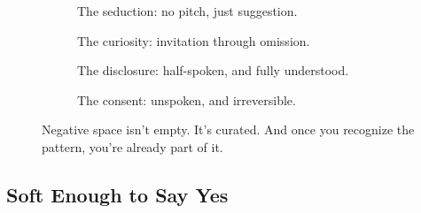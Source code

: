 \medskip

\begin{figure}[H]
  \centering
  
  \begin{subfigure}[t]{0.45\textwidth}
  \centering
  \caption*{The seduction: no pitch, just suggestion.}
  \end{subfigure}
  \hfill
  \begin{subfigure}[t]{0.45\textwidth}
  \centering
  \caption*{The curiosity: invitation through omission.}
  \end{subfigure}
  
  \vspace{1em}
  
  \begin{subfigure}[t]{0.45\textwidth}
  \centering
  \caption*{The disclosure: half-spoken, and fully understood.}
  \end{subfigure}
  \hfill
  \begin{subfigure}[t]{0.45\textwidth}
  \centering
  \caption*{The consent: unspoken, and irreversible.}
  \end{subfigure}
  
  \caption*{Negative space isn’t empty. It’s curated. And once you recognize the pattern, you’re already part of it.}
\end{figure}

\medskip

\subsection{Soft Enough to Say Yes}

